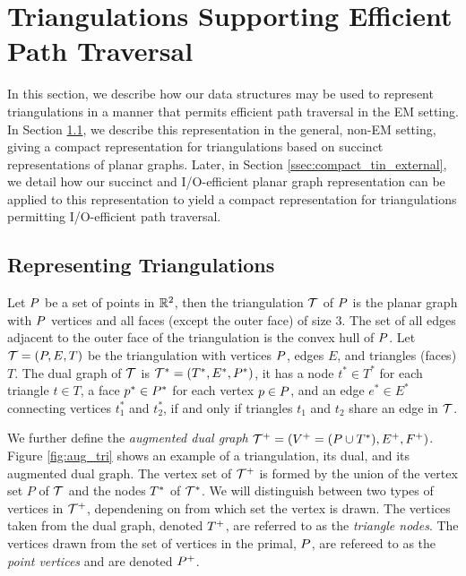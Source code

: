 {%
\section{Triangulations Supporting Efficient Path Traversal}
\label{sec:tins}

In this section, we describe how our data structures may be used to 
represent triangulations in a manner that permits efficient path
traversal in the EM setting.
In Section \ref{ssec:triangulation_rep}, we describe this representation in the 
general, non-EM setting, giving a compact representation for triangulations 
based on succinct representations of planar graphs.
Later, in Section \ref{ssec:compact_tin_external}, we detail how our succinct
and I/O-efficient planar graph representation can be applied to this representation
to yield a compact representation for 
triangulations permitting I/O-efficient path traversal.

\subsection{Representing Triangulations}
\label{ssec:triangulation_rep}

Let $P$ be a set of points in $\mathbb{R}^2$, then the triangulation $\mathcal{T}$
of $P$ is the planar graph with $P$ vertices and all faces 
(except the outer face) of size $3$.
The set of all edges adjacent to the outer face of the triangulation is the
convex hull of $P$. 
Let $\mathcal{T} = (P,E,T)$ be the triangulation with vertices $P$, 
edges $E$, and 
triangles (faces) $T$. 
The dual graph of $\mathcal{T}$ is $\mathcal{T}^* = (T^*,E^*,P^*)$, it has a node
 $t^* \in T^*$ for each triangle $t \in T$, a face $p^* \in P^*$ for each 
vertex $p \in P$, and an edge $e^* \in E^*$ connecting vertices $t^*_1$ and
 $t^*_2$, if and only if triangles $t_1$ and $t_2$ share an edge in $\mathcal{T}$.

We further define the \emph{augmented dual graph} 
 $\mathcal{T}^+ = (V^+ = (P \cup T^*), E^+,
F^+)$.
Figure \ref{fig:aug_tri} shows an example of a triangulation, its dual, 
and its augmented dual graph.
The vertex set of $\mathcal{T}^+$ is formed by the union of the vertex set 
$P$ of $\mathcal{T}$ and the nodes $T^*$ of $\mathcal{T}^*$. 
We will distinguish between two types of vertices in $\mathcal{T}^+$, 
dependening on from which set the vertex is drawn. 
The vertices taken from the dual graph, denoted $T^+$, 
are referred to as the \emph{triangle nodes}. 
The vertices drawn from the set of vertices in the primal, $P$, 
are refereed   
to as the \emph{point vertices} and are denoted $P^+$.

}
